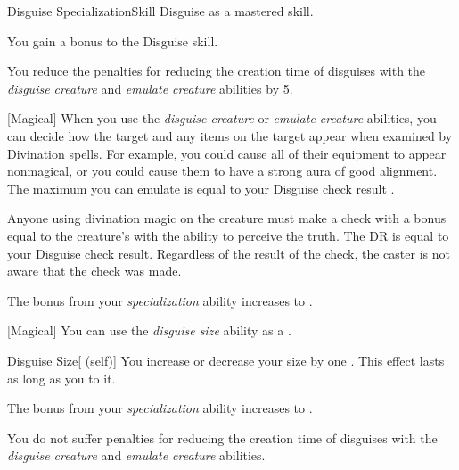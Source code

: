     \begin{feat}{Disguise Specialization}{Skill}
        \featpre Disguise as a mastered skill.

         You gain a  bonus to the Disguise skill.

         You reduce the penalties for reducing the creation time of disguises with the \textit{disguise creature} and \textit{emulate creature} abilities by 5.

        [Magical] When you use the \textit{disguise creature} or \textit{emulate creature} abilities, you can decide how the target and any items on the target appear when examined by Divination spells.
        For example, you could cause all of their equipment to appear nonmagical, or you could cause them to have a strong aura of good alignment.
        The maximum  you can emulate is equal to your Disguise check result .

        Anyone using divination magic on the creature must make a check with a bonus equal to the creature's  with the ability to perceive the truth.
        The DR is equal to your Disguise check result.
        Regardless of the result of the check, the caster is not aware that the check was made.

         The bonus from your \textit{specialization} ability increases to .

        [Magical] You can use the \textit{disguise size} ability as a .
        \begin{attuneability}{Disguise Size}[ (self)]
            You increase or decrease your size by one .
            This effect lasts as long as you  to it.
        \end{attuneability}

         The bonus from your \textit{specialization} ability increases to .

         You do not suffer penalties for reducing the creation time of disguises with the \textit{disguise creature} and \textit{emulate creature} abilities.
    \end{feat}

